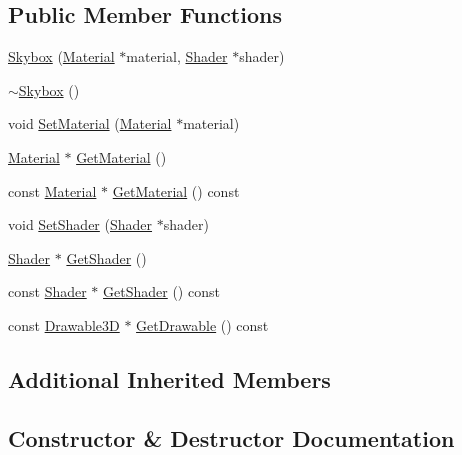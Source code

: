 \subsection*{Public Member Functions}
\begin{DoxyCompactItemize}
\item 
\mbox{\hyperlink{classec_1_1_skybox_ade64ed22adf0d932a1084ac36ef2f804}{Skybox}} (\mbox{\hyperlink{classec_1_1_material}{Material}} $\ast$material, \mbox{\hyperlink{classec_1_1_shader}{Shader}} $\ast$shader)
\item 
\mbox{\hyperlink{classec_1_1_skybox_a46b40cfaeff9de77af5a3388c35f4f9e}{$\sim$\+Skybox}} ()
\item 
void \mbox{\hyperlink{classec_1_1_skybox_a38672f2c699d1505eb84ca12861e9b4c}{Set\+Material}} (\mbox{\hyperlink{classec_1_1_material}{Material}} $\ast$material)
\item 
\mbox{\hyperlink{classec_1_1_material}{Material}} $\ast$ \mbox{\hyperlink{classec_1_1_skybox_a594231bac00ce877daefa392dad1573d}{Get\+Material}} ()
\item 
const \mbox{\hyperlink{classec_1_1_material}{Material}} $\ast$ \mbox{\hyperlink{classec_1_1_skybox_ae231b7b992340d901131fc65946fbd4e}{Get\+Material}} () const
\item 
void \mbox{\hyperlink{classec_1_1_skybox_a4d5f0d3ffa342987acb3e381be1a103d}{Set\+Shader}} (\mbox{\hyperlink{classec_1_1_shader}{Shader}} $\ast$shader)
\item 
\mbox{\hyperlink{classec_1_1_shader}{Shader}} $\ast$ \mbox{\hyperlink{classec_1_1_skybox_ab63b1a4a1f926e16f75cf071db9d2127}{Get\+Shader}} ()
\item 
const \mbox{\hyperlink{classec_1_1_shader}{Shader}} $\ast$ \mbox{\hyperlink{classec_1_1_skybox_a4843db2aecab69cb7759edfbb25630d3}{Get\+Shader}} () const
\item 
const \mbox{\hyperlink{classec_1_1_drawable3_d}{Drawable3D}} $\ast$ \mbox{\hyperlink{classec_1_1_skybox_ac635f071c2cf2187f208008d05333031}{Get\+Drawable}} () const
\end{DoxyCompactItemize}
\subsection*{Additional Inherited Members}


\subsection{Constructor \& Destructor Documentation}
\mbox{\label{classec_1_1_skybox_ade64ed22adf0d932a1084ac36ef2f804}} 
